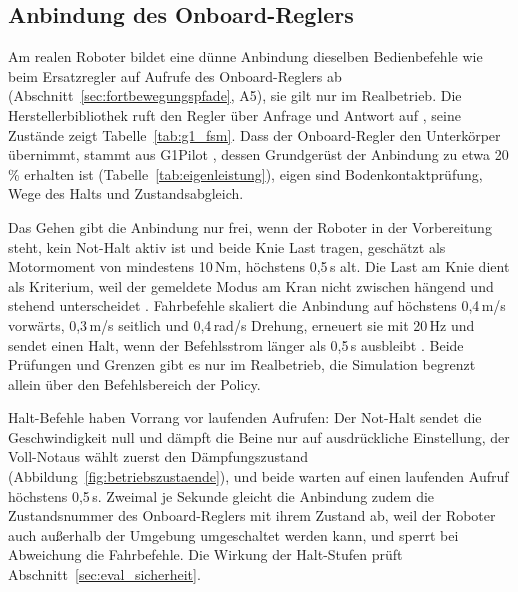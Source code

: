 \subsection{Anbindung des Onboard-Reglers}
\label{sec:onboard_anbindung}
Am realen Roboter bildet eine dünne Anbindung dieselben Bedienbefehle wie beim Ersatzregler auf Aufrufe des Onboard-Reglers ab (Abschnitt~\ref{sec:fortbewegungspfade}, A5), sie gilt nur im Realbetrieb.
Die Herstellerbibliothek ruft den Regler über Anfrage und Antwort auf \cite{UnitreeSDK2Py}, seine Zustände zeigt Tabelle~\ref{tab:g1_fsm}.
Dass der Onboard-Regler den Unterkörper übernimmt, stammt aus G1Pilot \cite{HucebotG1Pilot}, dessen Grundgerüst der Anbindung zu etwa 20\,\% erhalten ist (Tabelle~\ref{tab:eigenleistung}), eigen sind Bodenkontaktprüfung, Wege des Halts und Zustandsabgleich.

Das Gehen gibt die Anbindung nur frei, wenn der Roboter in der Vorbereitung steht, kein Not-Halt aktiv ist und beide Knie Last tragen, geschätzt als Motormoment von mindestens 10\,Nm, höchstens 0,5\,s alt.
Die Last am Knie dient als Kriterium, weil der gemeldete Modus am Kran nicht zwischen hängend und stehend unterscheidet .
Fahrbefehle skaliert die Anbindung auf höchstens 0,4\,m/s vorwärts, 0,3\,m/s seitlich und 0,4\,rad/s Drehung, erneuert sie mit 20\,Hz und sendet einen Halt, wenn der Befehlsstrom länger als 0,5\,s ausbleibt .
Beide Prüfungen und Grenzen gibt es nur im Realbetrieb, die Simulation begrenzt allein über den Befehlsbereich der Policy.

Halt-Befehle haben Vorrang vor laufenden Aufrufen: Der Not-Halt sendet die Geschwindigkeit null und dämpft die Beine nur auf ausdrückliche Einstellung, der Voll-Notaus wählt zuerst den Dämpfungszustand (Abbildung~\ref{fig:betriebszustaende}), und beide warten auf einen laufenden Aufruf höchstens 0,5\,s.
Zweimal je Sekunde gleicht die Anbindung zudem die Zustandsnummer des Onboard-Reglers mit ihrem Zustand ab, weil der Roboter auch außerhalb der Umgebung umgeschaltet werden kann, und sperrt bei Abweichung die Fahrbefehle.
Die Wirkung der Halt-Stufen prüft Abschnitt~\ref{sec:eval_sicherheit}.

